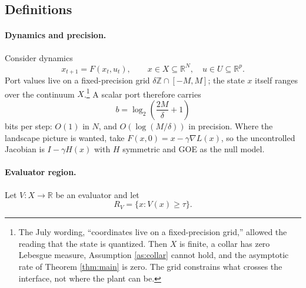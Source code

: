 \documentclass[11pt]{article}
\theoremstyle{definition}
\theoremstyle{remark}
\newcommand{\RV}{R_V}
\begin{document}
\subsection{Definitions}

\paragraph{Dynamics and precision.} Consider dynamics
\begin{equation}
x_{t+1}=F(x_t,u_t),\qquad x\in X\subseteq\mathbb{R}^N,\quad u\in U\subseteq\mathbb{R}^p. \label{eq:dyn}
\end{equation}
Port values live on a fixed-precision grid $\delta\mathbb{Z}\cap[-M,M]$; the state $x$ itself ranges over the continuum $X$.\footnote{The July wording, ``coordinates live on a fixed-precision grid,'' allowed the reading that the state is quantized. Then $X$ is finite, a collar has zero Lebesgue measure, Assumption \ref{as:collar} cannot hold, and the asymptotic rate of Theorem \ref{thm:main} is zero. The grid constrains what crosses the interface, not where the plant can be.} A scalar port therefore carries
\begin{equation}
b=\log_2\!\left(\frac{2M}{\delta}+1\right) \label{eq:bits}
\end{equation}
bits per step: $O(1)$ in $N$, and $O(\log(M/\delta))$ in precision. Where the landscape picture is wanted, take $F(x,0)=x-\gamma\nabla L(x)$, so the uncontrolled Jacobian is $I-\gamma H(x)$ with $H$ symmetric and GOE as the null model.

\paragraph{Evaluator region.} Let $V:X\to\mathbb{R}$ be an evaluator and let
\begin{equation}
\RV=\{x: V(x)\ge\tau\}. \label{eq:region}
\end{equation}
\end{document}
